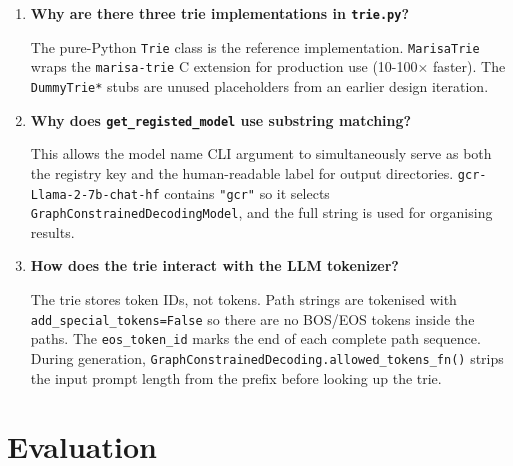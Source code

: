\documentclass[11pt,a4paper,oneside,openany]{book}
\theoremstyle{definition}
\newcommand{\code}[1]{\texttt{#1}}
\newcommand{\pkg}[1]{\texttt{#1}}
\begin{document}
\begin{enumerate}

	\item \textbf{Why are there three trie implementations in \texttt{trie.py}?}

	      The pure-Python \code{Trie} class is the reference implementation. \code{MarisaTrie} wraps the \pkg{marisa-trie} C extension for production use (10-100$\times$ faster). The \code{DummyTrie*} stubs are unused placeholders from an earlier design iteration.

	\item \textbf{Why does \texttt{get\_registed\_model} use substring matching?}

	      This allows the model name CLI argument to simultaneously serve as both the registry key and the human-readable label for output directories. \code{gcr-Llama-2-7b-chat-hf} contains \code{"gcr"} so it selects \code{GraphConstrainedDecodingModel}, and the full string is used for organising results.

	\item \textbf{How does the trie interact with the LLM tokenizer?}

	      The trie stores token IDs, not tokens. Path strings are tokenised with \code{add\_special\_tokens=False} so there are no BOS/EOS tokens inside the paths. The \code{eos\_token\_id} marks the end of each complete path sequence. During generation, \code{GraphConstrainedDecoding.allowed\_tokens\_fn()} strips the input prompt length from the prefix before looking up the trie.

\end{enumerate}

\section{Evaluation}
\end{document}
